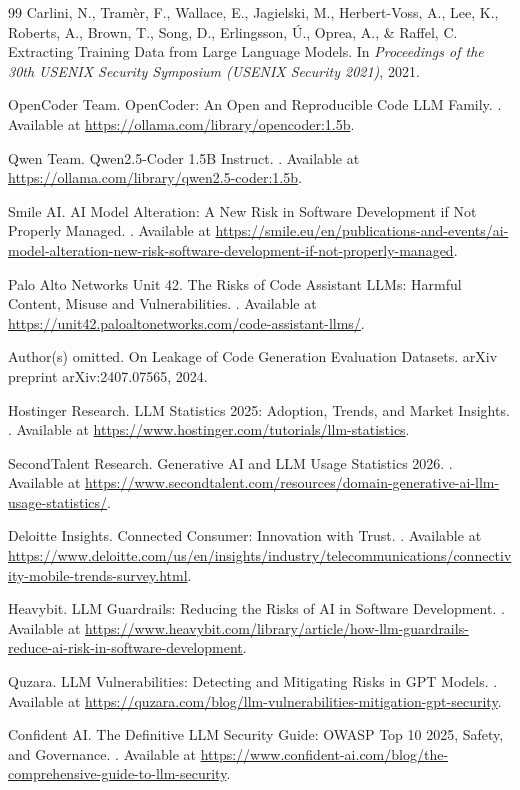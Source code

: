 \documentclass[11pt]{article}
\begin{document}
\begin{thebibliography}{99}
Carlini, N., Tramèr, F., Wallace, E., Jagielski, M., Herbert-Voss, A., Lee, K., Roberts, A.,
Brown, T., Song, D., Erlingsson, Ú., Oprea, A., \& Raffel, C.
\newblock Extracting Training Data from Large Language Models.
\newblock In \emph{Proceedings of the 30th USENIX Security Symposium (USENIX Security 2021)}, 2021.

OpenCoder Team.
\newblock OpenCoder: An Open and Reproducible Code LLM Family.
. Available at \url{https://ollama.com/library/opencoder:1.5b}.

Qwen Team.
\newblock Qwen2.5-Coder 1.5B Instruct.
. Available at \url{https://ollama.com/library/qwen2.5-coder:1.5b}.

Smile AI.
\newblock AI Model Alteration: A New Risk in Software Development if Not Properly Managed.
. Available at \url{https://smile.eu/en/publications-and-events/ai-model-alteration-new-risk-software-development-if-not-properly-managed}.

Palo Alto Networks Unit 42.
\newblock The Risks of Code Assistant LLMs: Harmful Content, Misuse and Vulnerabilities.
. Available at \url{https://unit42.paloaltonetworks.com/code-assistant-llms/}.

Author(s) omitted.
\newblock On Leakage of Code Generation Evaluation Datasets.
\newblock arXiv preprint arXiv:2407.07565, 2024.

Hostinger Research.
\newblock LLM Statistics 2025: Adoption, Trends, and Market Insights.
. Available at \url{https://www.hostinger.com/tutorials/llm-statistics}.

SecondTalent Research.
\newblock Generative AI and LLM Usage Statistics 2026.
. Available at \url{https://www.secondtalent.com/resources/domain-generative-ai-llm-usage-statistics/}.

Deloitte Insights.
 Connected Consumer: Innovation with Trust.
. Available at \url{https://www.deloitte.com/us/en/insights/industry/telecommunications/connectivity-mobile-trends-survey.html}.

Heavybit.
\newblock LLM Guardrails: Reducing the Risks of AI in Software Development.
. Available at \url{https://www.heavybit.com/library/article/how-llm-guardrails-reduce-ai-risk-in-software-development}.

Quzara.
\newblock LLM Vulnerabilities: Detecting and Mitigating Risks in GPT Models.
. Available at \url{https://quzara.com/blog/llm-vulnerabilities-mitigation-gpt-security}.

Confident AI.
\newblock The Definitive LLM Security Guide: OWASP Top 10 2025, Safety, and Governance.
. Available at \url{https://www.confident-ai.com/blog/the-comprehensive-guide-to-llm-security}.


\end{thebibliography}
\end{document}
